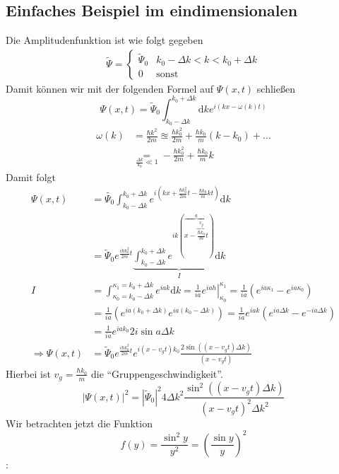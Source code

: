 \documentclass[oneside]{book}
\theoremstyle{definition}
\renewcommand{\d}{\mathrm d}
\begin{document}

\subsection{Einfaches Beispiel im eindimensionalen}
Die Amplitudenfunktion ist wie folgt gegeben
\begin{align*}
\tilde{\Psi} = \begin{cases}
\tilde{\Psi}_0 & k_0 - \Delta k < k < k_0 + \Delta k\\
0 & \text{sonst}
\end{cases}
\end{align*}
Damit können wir mit der folgenden Formel auf $\Psi(x, t)$ schließen
$$\Psi(x,t) = \tilde{\Psi}_0 \int_{k_0-\Delta k}^{k_0+\Delta k} \d k e^{i(kx - \omega(k)t)}$$
\begin{align*}
\omega(k) &= \frac{\hbar k^2}{2m} \approxeq \frac{\hbar k_0^2}{2m} + \frac{\hbar k_0}{m}(k - k_0) + \dots\\
&\underset{\frac{\Delta k}{k_0} \ll 1}{=} - \frac{\hbar k_0^2}{2m} + \frac{\hbar k_0}{m} k
\end{align*}
Damit folgt
\begin{align*}
\Psi(x,t) &= \tilde{\Psi_0} \int_{k_0 - \Delta k}^{k_0 + \Delta k} e^{i (kx + \frac{\hbar k_0^2}{2m}t - \frac{\hbar k_0}{m} k t)} \d k\\
&= \tilde{\Psi}_0  e^{\frac{i \hbar k_0^2}{2m}t}  \underbrace{\int_{k_0 - \Delta k}^{k_0 + \Delta k} e^{ik(\overbrace{x - \overbrace{\frac{\hbar k_0}{m}}^{v_g}t}^a)} \d k}_{I}\\
I &= \int_{\kappa_0 = k_0-\Delta k}^{\kappa_1 = k_0 + \Delta k} e^{iak} \d k = \left. \frac{1}{ia} e^{i a h} \right|_{\kappa_0}^{\kappa_1} = \frac1{ia} (e^{ia\kappa_1} - e^{ia\kappa_0})\\
&=\frac{1}{ia} (e^{ia(k_0 + \Delta k)} e^{ia (k_0 - \Delta k)}) = \frac{1}{ia} e^{iak} (e^{ia \Delta k} - e^{-ia \Delta k})\\
&= \frac{1}{ia} e^{ia k_0} 2 i \sin a \Delta k\\
\Rightarrow \Psi(x,t) &= \tilde{\Psi}_0 e^{\frac{i\hbar k_0^2}{2m} t} e^{i (x - v_g t) k_0} \frac{2 \sin((x - v_g t)\Delta k)}{(x - v_g t)}
\end{align*}
Hierbei ist $v_g = \frac{\hbar k_0}{m}$ die "`Gruppengeschwindigkeit"'.
$$|\Psi(x,t)|^2 = |\tilde{\Psi}_0|^2 4 \Delta k^2 \frac{\sin^2((x - v_g t)\Delta k)}{(x - v_g t)^2 \Delta k^2}$$
Wir betrachten jetzt die Funktion $$f(y) = \frac{\sin^2 y}{y^2} = \left(\frac{\sin y}{y}\right)^2$$:
\begin{center}
\end{center}
\end{document}
